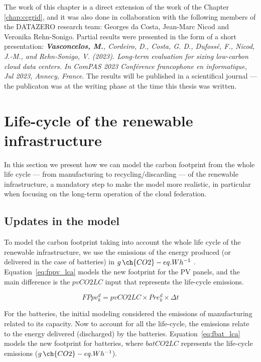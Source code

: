 The work of this chapter is a direct extension of the work of the Chapter \ref{chap:ccgrid}, and it was also done in collaboration with the following members of the DATAZERO\cite{datazero} research team: Georges da Costa, Jean-Marc Nicod and Veronika Rehn-Sonigo. Partial results were presented in the form of a short presentation:   \textit{\textbf{Vasconcelos, M.}, Cordeiro, D., Costa, G. D., Dufossé, F., Nicod, J.-M., and Rehn-Sonigo, V. (2023). Long-term evaluation for sizing low-carbon cloud data centers. In ComPAS 2023 Conférence francophone en informatique, Jul 2023, Annecy, France}. The results will be published in a scientifical journal --- the publicaton was at the writing phase at the time this thesis was written. 




\section{Life-cycle of the renewable infrastructure}
\label{sec:lifecicle}

In this section we present how we can model the carbon footprint from the whole life cycle --- from manufacturing to recycling/discarding --- of the renewable infrastructure,  a mandatory step to make the model more realistic, in particular when focusing on the long-term operation of the cloud federation.



\subsection{Updates in the model}

To model the carbon footprint taking into account the whole life cycle of the renewable infrastructure,  we use the emissions of the energy produced (or
delivered in the case of batteries) in $g\,\ch{CO2}-eq.Wh^{-1}$ . Equation~\eqref{eq:fppv_lca} models the new footprint for the PV panels, and the main difference is the $pvCO2LC$ input that represents the life-cycle emissions.

\begin{equation} \label{eq:fppv_lca}
   FPpv^d_k =  pvCO2LC \times Pre_k^d \times \Delta t
\end{equation}


For the batteries, the initial modeling considered the emissions of manufacturing related to its capacity. Now to account for all the life-cycle, the emissions relate to the energy delivered (discharged) by the batteries. Equation~\eqref{eq:fbat_lca} models the new footprint for batteries, where $batCO2LC$ represents the life-cycle emissions  ($g\,\ch{CO2}-eq.Wh^{-1}$).

